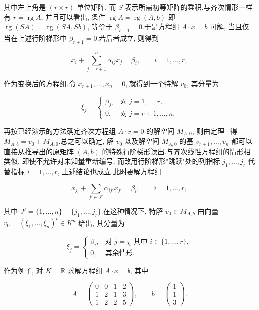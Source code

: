 其中左上角是 $(r \times r)$-单位矩阵, 而 $S$ 表示所需初等矩阵的乘积.与齐次情形一样有 $r = \operatorname{rg} A$, 并且可以看出, 条件 $\operatorname{rg} A = \operatorname{rg}(A, b)$ 即 $\operatorname{rg}(SA) = \operatorname{rg}(SA, Sb)$, 等价于 $\beta_{r + 1} = 0$.于是方程组 $A \cdot x = b$ 可解, 当且仅当在上述行阶梯形中 $\beta_{r + 1} = 0$.若后者成立, 则得到

\[
x_i + \sum_{j = r + 1}^{n}\alpha_{ij}x_j = \beta_i, \qquad i = 1, \ldots, r,
\]

作为变换后的方程组.令 $x_{r + 1}, \ldots, x_n = 0$, 就得到一个特解 $v_0$, 其分量为

\[
\xi_j = \begin{cases}
\beta_j, & \text{对 } j = 1, \ldots, r, \\
0, & \text{对 } j = r + 1, \ldots, n\text{.}
\end{cases}
\]

再按已经演示的方法确定齐次方程组 $A \cdot x = 0$ 的解空间 $M_{A, 0}$, 则由定理~ 得 $M_{A, b} = v_0 + M_{A, 0}$.总之可以确定, 解 $v_0$ 以及解空间 $M_{A, 0}$ 的基 $v_{r + 1}, \ldots, v_n$ 都可以直接从推导出的原矩阵 $(A, b)$ 的特殊行阶梯形读出.与齐次线性方程组的情形相类似, 即使不允许对未知量重新编号, 而改用行阶梯形"跳跃"处的列指标 $j_1, \ldots, j_r$ 代替指标 $i = 1, \ldots, r$, 上述结论也成立.此时要解方程组

\[
x_{j_i} + \sum_{j' \in J'}\alpha_{ij'}x_{j'} = \beta_i, \qquad i = 1, \ldots, r,
\]

其中 $J' = \{1, \ldots, n\} - \{j_1, \ldots, j_r\}$.在这种情况下, 特解 $v_0 \in M_{A, b}$ 由向量 $v_0 = (\xi_1, \ldots, \xi_n)^t \in K^n$ 给出, 其分量为

\[
\xi_j = \begin{cases}
\beta_i, & \text{对 } j = j_i \text{ 其中 } i \in \{1, \ldots, r\}, \\
0, & \text{其余情形}\text{.}
\end{cases}
\]

作为例子, 对 $K = \mathbb{R}$ 求解方程组 $A \cdot x = b$, 其中

\[
A = \begin{pmatrix} 0 & 0 & 1 & 2 \\ 1 & 2 & 1 & 3 \\ 1 & 2 & 2 & 5 \end{pmatrix}, \qquad
b = \begin{pmatrix} 1 \\ 1 \\ 3 \end{pmatrix}\text{.}
\]


